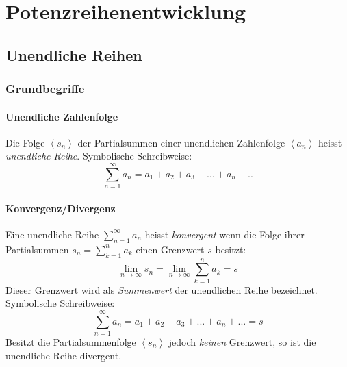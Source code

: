\chapter{Potenzreihenentwicklung}
\section{Unendliche Reihen}
\subsection{Grundbegriffe}
\subsubsection*{Unendliche Zahlenfolge}
\begin{definition}
Die Folge $\left<s_n\right>$ der Partialsummen einer unendlichen Zahlenfolge $\left<a_n\right>$ heisst \textit{unendliche Reihe}. Symbolische Schreibweise: 
$$ \sum\limits_{n=1}^{\infty} a_n = a_1 + a_2 + a_3 + ... + a_n + ..$$
\end{definition}

\subsubsection*{Konvergenz/Divergenz}
\begin{definition}Eine unendliche Reihe $\sum\limits_{n=1}^{\infty} a_n$ heisst \textit{konvergent} wenn die Folge ihrer Partialsummen $ s_n = \sum\limits_{k=1}^{n} a_k $ einen Grenzwert $s$ besitzt:
\[ \lim_{n \rightarrow \infty} s_n = \lim_{n \rightarrow \infty} \sum_{k=1}^{n} a_k = s \]
Dieser Grenzwert wird als \textit{Summenwert} der unendlichen Reihe bezeichnet. Symbolische Schreibweise:
$$\sum\limits_{n=1}^{\infty} a_n = a_1 + a_2 + a_3 + ...+ a_n +...=s$$
Besitzt die Partialsummenfolge $\left< s_n \right>$ jedoch \textit{keinen} Grenzwert, so ist die unendliche Reihe divergent.
\end{definition}

